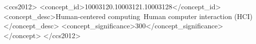 \documentclass[sigconf]{acmart}
\begin{document}
\title{}



\author{Lukas Gehrke}

\author{Klaus Gramann}

\renewcommand{\shortauthors}{Gehrke et al.}

\begin{abstract}

\end{abstract}


\begin{CCSXML}
<ccs2012>
    <concept_id>10003120.10003121.10003128</concept_id>
        <concept_desc>Human-centered computing~Human computer interaction (HCI)</concept_desc>
        <concept_significance>300</concept_significance>
    </concept>
 </ccs2012>
\end{CCSXML}



\maketitle
\end{document}
